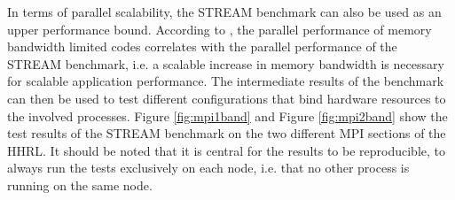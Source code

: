 In terms of parallel scalability, the STREAM benchmark can also be used as an upper performance bound. According to \cite{petsc-web-page}, the parallel performance of memory bandwidth limited codes correlates with the parallel performance of the STREAM benchmark, i.e. a scalable increase in memory bandwidth is necessary for scalable application performance. The intermediate results of the benchmark can then be used to test different configurations that bind hardware resources to the involved processes. Figure \ref{fig:mpi1band} and Figure \ref{fig:mpi2band} show the test results of the STREAM benchmark on the two different MPI sections of the HHRL. It should be noted that it is central for the results to be reproducible, to always run the tests exclusively on each node, i.e. that no other process is running on the same node. %


%    
%
%    
%
%
%    

